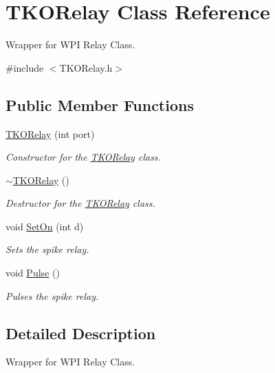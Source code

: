 \hypertarget{classTKORelay}{\section{\-T\-K\-O\-Relay \-Class \-Reference}
\label{classTKORelay}
}


\-Wrapper for \-W\-P\-I \-Relay \-Class.  




{\ttfamily \#include $<$\-T\-K\-O\-Relay.\-h$>$}

\subsection*{\-Public \-Member \-Functions}
\begin{DoxyCompactItemize}
\item 
\hyperlink{classTKORelay_a185407021ca76d02fc2d34c1c05fc813}{\-T\-K\-O\-Relay} (int port)
\begin{DoxyCompactList}\small\item\em \-Constructor for the \hyperlink{classTKORelay}{\-T\-K\-O\-Relay} class. \end{DoxyCompactList}\item 
\hypertarget{classTKORelay_a426ee22f9bb8db0dad83c9b5944818f9}{\hyperlink{classTKORelay_a426ee22f9bb8db0dad83c9b5944818f9}{$\sim$\-T\-K\-O\-Relay} ()}\label{classTKORelay_a426ee22f9bb8db0dad83c9b5944818f9}

\begin{DoxyCompactList}\small\item\em \-Destructor for the \hyperlink{classTKORelay}{\-T\-K\-O\-Relay} class. \end{DoxyCompactList}\item 
void \hyperlink{classTKORelay_a03b62b4248237ccf41ea9abe5e2df746}{\-Set\-On} (int d)
\begin{DoxyCompactList}\small\item\em \-Sets the spike relay. \end{DoxyCompactList}\item 
void \hyperlink{classTKORelay_a7f4c94b16dc33d4165410d83ef01e191}{\-Pulse} ()
\begin{DoxyCompactList}\small\item\em \-Pulses the spike relay. \end{DoxyCompactList}\end{DoxyCompactItemize}


\subsection{\-Detailed \-Description}
\-Wrapper for \-W\-P\-I \-Relay \-Class. 

